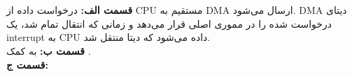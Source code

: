 ~\\
\\\textbf{قسمت الف:}
درخواست داده از
CPU
مستقیم به
DMA
ارسال می‌شود.
DMA
دیتای درخواست شده را در مموری اصلی قرار می‌دهد و زمانی که انتقال تمام شد، یک
interrupt
به
CPU
داده می‌شود که دیتا منتقل شد.
\\\textbf{قسمت ب:}
به کمک
.
\\\textbf{قسمت ج:}